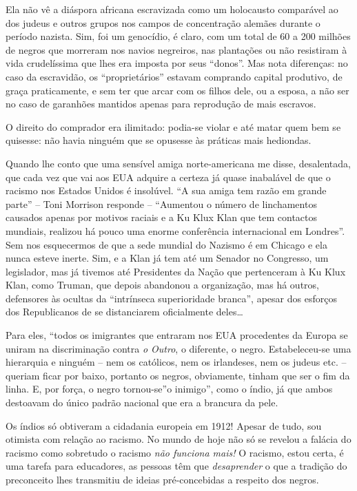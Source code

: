 \documentclass[
  letterpaper,
  DIV=11,
  numbers=noendperiod]{scrreprt}
\begin{document}
Ela não vê a diáspora africana escravizada como um holocausto comparável
ao dos judeus e outros grupos nos campos de concentração alemães durante
o período nazista. Sim, foi um genocídio, é claro, com um total de 60 a
200 milhões de negros que morreram nos navios negreiros, nas plantações
ou não resistiram à vida crudelíssima que lhes era imposta por seus
``donos''. Mas nota diferenças: no caso da escravidão, os
``proprietários'' estavam comprando capital produtivo, de graça
praticamente, e sem ter que arcar com os filhos dele, ou a esposa, a não
ser no caso de garanhões mantidos apenas para reprodução de mais
escravos.

O direito do comprador era ilimitado: podia-se violar e até matar quem
bem se quisesse: não havia ninguém que se opusesse às práticas mais
hediondas.

Quando lhe conto que uma sensível amiga norte-americana me disse,
desalentada, que cada vez que vai aos EUA adquire a certeza já quase
inabalável de que o racismo nos Estados Unidos é insolúvel. ``A sua
amiga tem razão em grande parte'' -- Toni Morrison responde --
``Aumentou o número de linchamentos causados apenas por motivos raciais
e a Ku Klux Klan que tem contactos mundiais, realizou há pouco uma
enorme conferência internacional em Londres''. Sem nos esquecermos de
que a sede mundial do Nazismo é em Chicago e ela nunca esteve inerte.
Sim, e a Klan já tem até um Senador no Congresso, um legislador, mas já
tivemos até Presidentes da Nação que pertenceram à Ku Klux Klan, como
Truman, que depois abandonou a organização, mas há outros, defensores às
ocultas da ``intrínseca superioridade branca'', apesar dos esforços dos
Republicanos de se distanciarem oficialmente deles\ldots{}

Para eles, ``todos os imigrantes que entraram nos EUA procedentes da
Europa se uniram na discriminação contra \emph{o Outro}, o diferente, o
negro. Estabeleceu-se uma hierarquia e ninguém -- nem os católicos, nem
os irlandeses, nem os judeus etc. -- queriam ficar por baixo, portanto
os negros, obviamente, tinham que ser o fim da linha. E, por força, o
negro tornou-se''o inimigo'', como o índio, já que ambos destoavam do
único padrão nacional que era a brancura da pele.

Os índios só obtiveram a cidadania europeia em 1912! Apesar de tudo, sou
otimista com relação ao racismo. No mundo de hoje não só se revelou a
falácia do racismo como sobretudo o racismo \emph{não funciona mais!} O
racismo, estou certa, é uma tarefa para educadores, as pessoas têm que
\emph{desaprender} o que a tradição do preconceito lhes transmitiu de
ideias pré-concebidas a respeito dos negros.
\end{document}
